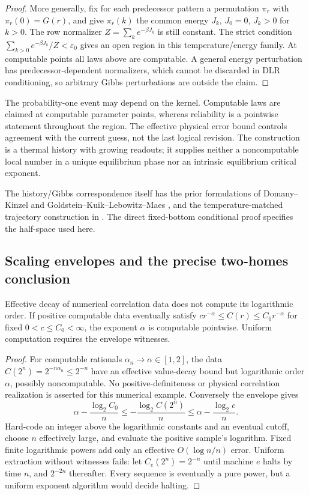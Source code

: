 \begin{proof}
More generally, fix for each predecessor pattern a permutation
$\pi_r$ with $\pi_r(0)=G(r)$, and give $\pi_r(k)$ the common
energy $J_k$, $J_0=0$, $J_k>0$ for $k>0$. The row normalizer
$Z=\sum_ke^{-\beta J_k}$ is still constant. The strict condition
$\sum_{k>0}e^{-\beta J_k}/Z<\varepsilon_0$ gives an open region
in this temperature/energy family. At computable points all laws
above are computable. A general energy perturbation has
predecessor-dependent normalizers, which cannot be discarded in DLR
conditioning, so arbitrary Gibbs perturbations are outside the claim.
\end{proof}

The probability-one event may depend on the kernel. Computable laws
are claimed at computable parameter points, whereas reliability is
a pointwise statement throughout the region. The effective physical
error bound controls agreement with the current guess, not the last
logical revision. The construction is a thermal history with growing
readouts; it supplies neither a noncomputable local number in a unique
equilibrium phase nor an intrinsic equilibrium critical exponent.

The history/Gibbs correspondence itself has the prior formulations of
Domany--Kinzel and Goldstein--Kuik--Lebowitz--Maes
\cite{domanyKinzel,pcaEquilibrium}, and the temperature-matched
trajectory construction in \cite{thermalTrajectories}. The direct
fixed-bottom conditional proof specifies the half-space used here.

\subsection{Scaling envelopes and the precise two-homes conclusion}
\begin{proposition}\label{prop:scaling-envelope}
Effective decay of numerical correlation data does not compute its
logarithmic order. If positive computable data eventually satisfy
$c r^{-\alpha}\leq C(r)\leq C_0r^{-\alpha}$ for fixed
$0<c\leq C_0<\infty$, the exponent $\alpha$ is computable
pointwise. Uniform computation requires the envelope witnesses.
\end{proposition}
\begin{proof}
For computable rationals $\alpha_n\to\alpha\in[1,2]$, the data
$C(2^n)=2^{-n\alpha_n}\leq2^{-n}$ have an effective value-decay
bound but logarithmic order $\alpha$, possibly noncomputable.
No positive-definiteness or physical correlation realization is
asserted for this numerical example. Conversely the envelope gives
\[
 \alpha-\frac{\log_2C_0}{n}
 \leq-\frac{\log_2C(2^n)}n
 \leq\alpha-\frac{\log_2c}{n}.
\]
Hard-code an integer above the logarithmic constants and an eventual
cutoff, choose $n$ effectively large, and evaluate the positive
sample's logarithm. Fixed finite logarithmic powers add only an
effective $O(\log n/n)$ error. Uniform extraction without witnesses
fails: let $C_e(2^n)=2^{-n}$ until machine $e$ halts by time $n$,
and $2^{-2n}$ thereafter. Every sequence is eventually a pure power,
but a uniform exponent algorithm would decide halting.
\end{proof}

